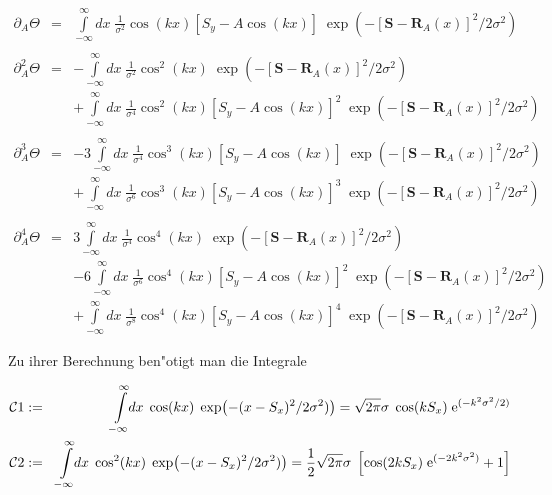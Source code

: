 \begin{small}
\begin{eqnarray*}
{\partial_A} \Theta &=&\int\limits_{-\infty}^{\infty}\!\!\!dx\; \frac{1}{\sigma^2} \cos(kx)\left[S_y-A\cos(kx)\right] \;\exp\!\left(-[\mathbf{S}-\mathbf{R}_A(x)]^2/2\sigma^2\right)\\
&&\\
{\partial^2_A}  \Theta &=& -\int\limits_{-\infty}^{\infty}\!\!\!dx\; \frac{1}{\sigma^2} \cos^2(kx) \;\exp\!\left(-[\mathbf{S}-\mathbf{R}_A(x)]^2/2\sigma^2\right) \\
&&+ \int\limits_{-\infty}^{\infty}\!\!\!dx\; \frac{1}{\sigma^4} \cos^2(kx)\left[S_y-A\cos(kx)\right]^2  \;\exp\!\left(-[\mathbf{S}-\mathbf{R}_A(x)]^2/2\sigma^2\right)\\
&&\\
{\partial^3_A}  \Theta &=& -3 \int\limits_{-\infty}^{\infty}\!\!\!dx\; \frac{1}{\sigma^4} \cos^3(kx) \left[S_y-A\cos(kx)\right] \;\exp\!\left(-[\mathbf{S}-\mathbf{R}_A(x)]^2/2\sigma^2\right) \\
&&+ \int\limits_{-\infty}^{\infty}\!\!\!dx\; \frac{1}{\sigma^6} \cos^3(kx) \left[S_y-A\cos(kx)\right]^3 \;\exp\!\left(-[\mathbf{S}-\mathbf{R}_A(x)]^2/2\sigma^2\right)\\
&&\\
{\partial^4_A}  \Theta &=& 3 \int\limits_{-\infty}^{\infty}\!\!\!dx\; \frac{1}{\sigma^4} \cos^4(kx) \;\exp\!\left(-[\mathbf{S}-\mathbf{R}_A(x)]^2/2\sigma^2\right) \\
&&- 6 \int\limits_{-\infty}^{\infty}\!\!\!dx\; \frac{1}{\sigma^6} \cos^4(kx) \left[S_y-A\cos(kx)\right]^2 \;\exp\!\left(-[\mathbf{S}-\mathbf{R}_A(x)]^2/2\sigma^2\right) \\
&&+\int\limits_{-\infty}^{\infty}\!\!\!dx\; \frac{1}{\sigma^8} \cos^4(kx) \left[S_y-A\cos(kx)\right]^4 \;\exp\!\left(-[\mathbf{S}-\mathbf{R}_A(x)]^2/2\sigma^2\right)
\end{eqnarray*}
\end{small}

\noindent Zu ihrer Berechnung ben"otigt man die Integrale

\begin{small}
\begin{eqnarray*}
{\cal C}1 &:=&\;\;\int\limits_{-\infty}^{\infty}\!\!dx\;\cos(kx)\;\exp\!\left(-(x-S_x)^2/2\sigma^2)\right)=\sqrt{2\pi}\sigma\;\cos(kS_x)\;{\rm e}^{(-k^2\sigma^2/2)}\\
{\cal C}2 &:=&\int\limits_{-\infty}^{\infty}\!\!dx\;\cos^2(kx)\;\exp\!\left(-(x-S_x)^2/2\sigma^2)\right)=\frac{1}{2}\sqrt{2\pi}\sigma\;\left[\cos(2kS_x)\;{\rm e}^{(-2k^2\sigma^2)}+1\right]
\end{eqnarray*}
\end{small}

